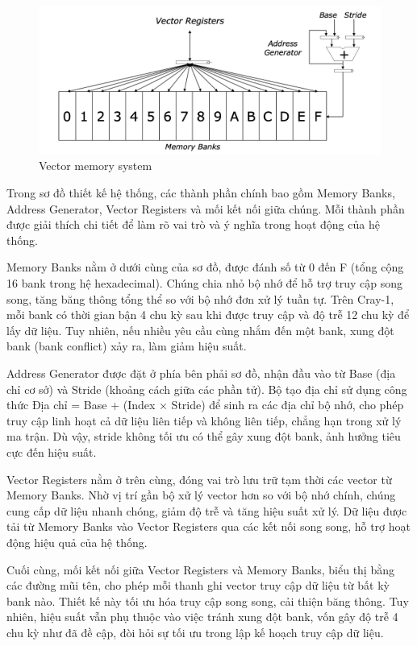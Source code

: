 \documentclass[a4paper]{article}
\begin{document}
\begin{figure}[H]
    \centering
    \includegraphics[width=1\linewidth]{assets/vector-mem-model.png}
    \caption{Vector memory system}
    \label{fig:enter-label}
\end{figure}

Trong sơ đồ thiết kế hệ thống, các thành phần chính bao gồm Memory Banks, Address Generator, Vector Registers và mối kết nối giữa chúng. Mỗi thành phần được giải thích chi tiết để làm rõ vai trò và ý nghĩa trong hoạt động của hệ thống.

Memory Banks nằm ở dưới cùng của sơ đồ, được đánh số từ 0 đến F (tổng cộng 16 bank trong hệ hexadecimal). Chúng chia nhỏ bộ nhớ để hỗ trợ truy cập song song, tăng băng thông tổng thể so với bộ nhớ đơn xử lý tuần tự. Trên Cray-1, mỗi bank có thời gian bận 4 chu kỳ sau khi được truy cập và độ trễ 12 chu kỳ để lấy dữ liệu. Tuy nhiên, nếu nhiều yêu cầu cùng nhắm đến một bank, xung đột bank (bank conflict) xảy ra, làm giảm hiệu suất.

Address Generator được đặt ở phía bên phải sơ đồ, nhận đầu vào từ Base (địa chỉ cơ sở) và Stride (khoảng cách giữa các phần tử). Bộ tạo địa chỉ sử dụng công thức Địa chỉ = Base + (Index × Stride) để sinh ra các địa chỉ bộ nhớ, cho phép truy cập linh hoạt cả dữ liệu liên tiếp và không liên tiếp, chẳng hạn trong xử lý ma trận. Dù vậy, stride không tối ưu có thể gây xung đột bank, ảnh hưởng tiêu cực đến hiệu suất.

Vector Registers nằm ở trên cùng, đóng vai trò lưu trữ tạm thời các vector từ Memory Banks. Nhờ vị trí gần bộ xử lý vector hơn so với bộ nhớ chính, chúng cung cấp dữ liệu nhanh chóng, giảm độ trễ và tăng hiệu suất xử lý. Dữ liệu được tải từ Memory Banks vào Vector Registers qua các kết nối song song, hỗ trợ hoạt động hiệu quả của hệ thống.

Cuối cùng, mối kết nối giữa Vector Registers và Memory Banks, biểu thị bằng các đường mũi tên, cho phép mỗi thanh ghi vector truy cập dữ liệu từ bất kỳ bank nào. Thiết kế này tối ưu hóa truy cập song song, cải thiện băng thông. Tuy nhiên, hiệu suất vẫn phụ thuộc vào việc tránh xung đột bank, vốn gây độ trễ 4 chu kỳ như đã đề cập, đòi hỏi sự tối ưu trong lập kế hoạch truy cập dữ liệu.
\end{document}
